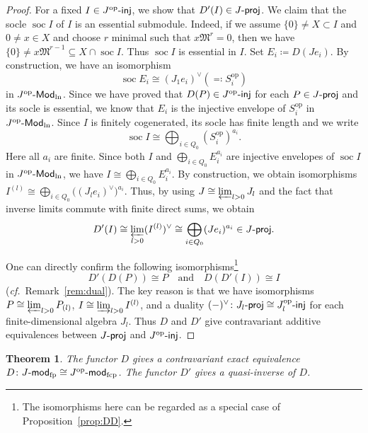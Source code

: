 \documentclass[12pt]{amsart}
\newtheorem{theorem}{Theorem}[section]
\theoremstyle{definition}
\theoremstyle{remark}
\numberwithin{equation}{section}
\newcommand{\confer}{\textit{cf.}\ }
\newcommand{\injc}{\mathchar`-\mathsf{inj}}
\newcommand{\projc}{\mathchar`-\mathsf{proj}}
\newcommand{\modfp}{\mathchar`-\mathsf{mod}_{\mathrm{fp}}}
\newcommand{\modfcp}{\mathchar`-\mathsf{mod}_{\mathrm{fcp}}}
\newcommand{\op}{\mathrm{op}}
\newcommand{\Modln}{\mathchar`-\mathsf{Mod}_{\mathrm{ln}}}
\begin{document}
\begin{proof}
For a fixed $I\in J^\op\injc$, we show that $D'(I)\in J\projc$. We claim that
the socle $\operatorname{soc}I$ of  $I$ is an essential submodule. Indeed, if we assume $\{0\}\neq X\subset I$ and $0\neq x\in X$ and choose $r$
minimal such that $x\mathfrak M^r=0$, then we have
$\{0\}\neq x\mathfrak M^{r-1}\subseteq
X\cap\operatorname{soc}I$.
Thus $\operatorname{soc}I$ is essential in $I$.
Set $E_i\coloneqq D(Je_i)$. By construction, we have an isomorphism
\[
\operatorname{soc}E_i \cong (J_1e_i)^\vee(\eqqcolon S_i^{\op})
\]
in $J^{\op}\Modln$.
Since we have proved that $D(P)\in J^\op\injc$ for each $P\in J\projc$ and its socle is essential, we know that $E_i$ is the injective envelope of $S_i^{\op}$ in $J^{\op}\Modln$.
Since $I$ is
finitely cogenerated, its socle has finite length and we write
\[
\operatorname{soc}I\cong
\bigoplus_{i\in Q_0}(S_i^{\op})^{a_i}.
\]
Here all $a_i$ are finite.
Since both $I$ and $\bigoplus_{i\in Q_0}E_i^{a_i}$ are injective envelopes
of $\operatorname{soc}I$ in $J^{\op}\Modln$, we have
$I\cong\bigoplus_{i\in Q_0}E_i^{a_i}$.
By construction, we obtain isomorphisms
$I^{(l)}\cong
\bigoplus_{i\in Q_0}\bigl((J_le_i)^\vee\bigr)^{a_i}$.
Thus, by using $J\cong\varprojlim_{l>0} J_l$ and the fact that inverse
limits commute with finite direct sums, we obtain
\[
D'(I)\cong
\varprojlim_{l>0} (I^{(l)})^\vee
\cong \bigoplus_{i\in Q_0}(Je_i)^{a_i}\in J\projc.
\]


One can directly confirm the following isomorphisms\footnote{The isomorphisms here  can be  regarded as a special case of Proposition~\ref{prop:DD}.}
\[D'(D(P)) \cong P\quad \text{and}\quad 
D(D'(I)) \cong  I
\]
(\confer Remark~\ref{rem:dual}). The key reason is that we have isomorphisms $P \cong \varprojlim_{l>0} P_{(l)}$, $I \cong \varinjlim_{l>0} I^{(l)}$, and a duality $(-)^\vee\colon J_l\projc \cong J_l^\op\injc$ for each finite-dimensional algebra $J_l$. 
Thus $D$ and $D'$ give contravariant additive equivalences between $J\projc$ and $J^\op\injc$. 
\end{proof}
\begin{theorem}\label{thm:Dequiv2}
    The functor $D$ gives a contravariant exact equivalence $D\colon J\modfp\cong J^\op\modfcp$. The functor $D'$ gives a quasi-inverse of $D$.
\end{theorem}
\end{document}
